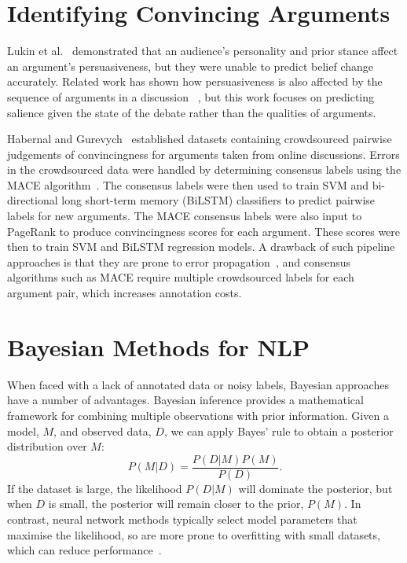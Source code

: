\section{Identifying Convincing Arguments}\label{sec:related}

Lukin et al.~ demonstrated that an audience's personality and prior stance affect
an argument's persuasiveness, but they were unable to predict belief change accurately.
Related work has shown how persuasiveness is also affected by the sequence of arguments in a discussion 
~\cite{tan2016winning,rosenfeld2016providing,monteserin2013reinforcement},
but this work focuses on predicting salience given the state of the debate rather than the qualities of arguments.

Habernal and Gurevych~ established datasets
containing crowdsourced pairwise judgements of convincingness for arguments taken from online discussions. 
Errors in the crowdsourced data were handled by determining consensus labels using the MACE algorithm~\cite{hovy2013learning}.
The consensus labels were then used to train SVM and bi-directional long short-term memory (BiLSTM) classifiers to predict pairwise
labels for new arguments. 
The MACE consensus labels were also input to PageRank to produce convincingness scores for each argument. 
These scores were then to train SVM and BiLSTM regression models.
A drawback of such pipeline approaches is that they are prone to error propagation~\cite{chen2016joint},
and consensus algorithms such as MACE require multiple crowdsourced labels for each argument pair, 
which increases annotation costs.

\section{Bayesian Methods for NLP}\label{sec:bayesian}

When faced with a lack of annotated data or noisy labels, 
Bayesian approaches have a number of advantages.
Bayesian inference provides a mathematical framework for combining multiple observations
with prior information. 
Given a model, $M$, and observed data, $D$, we can apply Bayes' rule
to obtain a posterior distribution over $M$:
\begin{equation}
  P(M|D) = \frac{P(D|M)P(M)}{P(D)}.
  \label{eq:bayesrule}
\end{equation}
If the dataset is large, the likelihood $P(D|M)$ will dominate the posterior,
but when $D$ is small, the posterior will remain closer to the prior, $P(M)$.
In contrast, neural network methods typically select model parameters that maximise the likelihood,
so are more prone to overfitting with small datasets, which can reduce performance~\cite{xiong2011bayesian}.

